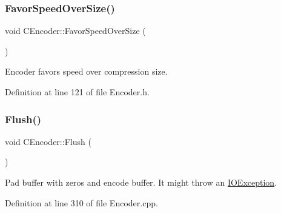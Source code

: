 \subsubsection{\texorpdfstring{FavorSpeedOverSize()}{FavorSpeedOverSize()}}
{\footnotesize\ttfamily void C\+Encoder\+::\+Favor\+Speed\+Over\+Size (\begin{DoxyParamCaption}{ }\end{DoxyParamCaption})\hspace{0.3cm}{\ttfamily [inline]}}



Encoder favors speed over compression size. 



Definition at line 121 of file Encoder.\+h.


\begin{DoxyCode}{0}

\end{DoxyCode}
\mbox{\label{classCEncoder_a8e25f046e6f9bb67a7c5b3e71e5b6a32}} 
\subsubsection{\texorpdfstring{Flush()}{Flush()}}
{\footnotesize\ttfamily void C\+Encoder\+::\+Flush (\begin{DoxyParamCaption}{ }\end{DoxyParamCaption})}

Pad buffer with zeros and encode buffer. It might throw an \mbox{\hyperlink{structIOException}{I\+O\+Exception}}. 

Definition at line 310 of file Encoder.\+cpp.


